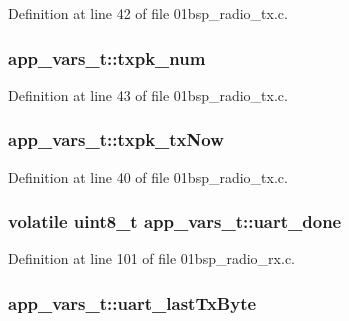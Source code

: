 Definition at line 42 of file 01bsp\+\_\+radio\+\_\+tx.\+c.

\subsubsection[{\texorpdfstring{txpk\+\_\+num}{txpk_num}}]{ app\+\_\+vars\+\_\+t\+::txpk\+\_\+num}\hypertarget{structapp__vars__t_a330ab4079f088c7d6ccefdf99e8ec12a}{}\label{structapp__vars__t_a330ab4079f088c7d6ccefdf99e8ec12a}


Definition at line 43 of file 01bsp\+\_\+radio\+\_\+tx.\+c.

\subsubsection[{\texorpdfstring{txpk\+\_\+tx\+Now}{txpk_txNow}}]{ app\+\_\+vars\+\_\+t\+::txpk\+\_\+tx\+Now}\hypertarget{structapp__vars__t_a3630f7b330b97185b364a11a7abd8c20}{}\label{structapp__vars__t_a3630f7b330b97185b364a11a7abd8c20}


Definition at line 40 of file 01bsp\+\_\+radio\+\_\+tx.\+c.

\subsubsection[{\texorpdfstring{uart\+\_\+done}{uart_done}}]{\setlength{\rightskip}{0pt plus 5cm}volatile {\bf uint8\+\_\+t} app\+\_\+vars\+\_\+t\+::uart\+\_\+done}\hypertarget{structapp__vars__t_a28deb5e77b7d7172218c88720ab45147}{}\label{structapp__vars__t_a28deb5e77b7d7172218c88720ab45147}


Definition at line 101 of file 01bsp\+\_\+radio\+\_\+rx.\+c.

\subsubsection[{\texorpdfstring{uart\+\_\+last\+Tx\+Byte}{uart_lastTxByte}}]{ app\+\_\+vars\+\_\+t\+::uart\+\_\+last\+Tx\+Byte}\hypertarget{structapp__vars__t_a18bdd21f03173b9b53d85c85e0ed7fb3}{}\label{structapp__vars__t_a18bdd21f03173b9b53d85c85e0ed7fb3}


